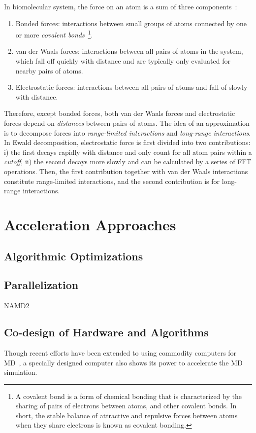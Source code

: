 \documentclass[a4paper,10pt,technote,compsoc,onecolumn]{IEEEtran}
\numberwithin{equation}{section}
\begin{document}
In biomolecular system, the force on an atom is a sum of three
components~\cite{shaw10science,shaw09sc}:
\begin{enumerate}
  \item Bonded forces: interactions between small groups of atoms connected
  by one or more {\em covalent bonds}~\footnote{A covalent bond is a form of
  chemical bonding that is characterized by the sharing of pairs of electrons
  between atoms, and other covalent bonds. In short, the stable balance of
  attractive and repulsive forces between atoms when they share electrons is
  known as covalent bonding.}.
  \item van der Waals forces: interactions between all pairs of atoms in the
  system, which fall off quickly with distance and are typically only 
  evaluated for nearby pairs of atoms.
  \item Electrostatic forces: interactions between all pairs of atoms and fall
  of slowly with distance.
\end{enumerate}

Therefore, except bonded forces, both van der Waals forces and electrostatic
forces depend on {\em distances} between pairs of atoms. The idea of an
approximation is to decompose forces into {\em range-limited interactions} and
{\em long-range interactions}. In Ewald decomposition, electrostatic force is
first divided into two contributions: i) the first decays rapidly with 
distance and only count for all atom pairs within a {\em cutoff}, ii) the
second decays more slowly and can be calculated by a series of \ac{FFT}
operations. Then, the first contribution together with van der Waals
interactions constitute range-limited interactions, and the second 
contribution is for long-range interactions.


\section{Acceleration Approaches}
\subsection{Algorithmic Optimizations}

\subsection{Parallelization}
NAMD2~\cite{kale98namd2}

\subsection{Co-design of Hardware and Algorithms}
Though recent efforts have been extended to using commodity computers for
\ac{MD}~\cite{bhatele08ipdps, bowers06sc,hess08jctc}, a specially designed
computer also shows its power to accelerate the \ac{MD} simulation.
\end{document}
